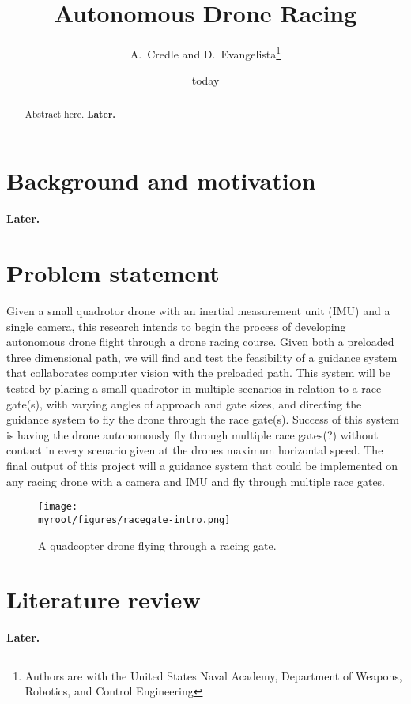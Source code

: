 \documentclass[onecolumn,10pt]{IEEEtran}
\title{Autonomous Drone Racing}
\author{A.~Credle and D.~Evangelista\thanks{Authors are with the United States Naval Academy, Department of Weapons, Robotics, and Control Engineering}}
\date{today}
\newcommand{\myroot}{../}
\newcommand{\Later}{\textbf{Later.}}
\begin{document}
\maketitle

\begin{abstract}
Abstract here. \Later
\end{abstract}

\section{Background and motivation}
\Later

\section{Problem statement}
Given a small quadrotor drone with an inertial measurement unit (IMU) and a single camera, this research intends to begin the process of developing autonomous drone flight through a drone racing course. Given both a preloaded three dimensional path,  we will find and test the feasibility of a guidance system that collaborates computer vision with the preloaded path. This system will be tested by placing a small quadrotor in multiple scenarios in relation to a race gate(s), with varying angles of approach and gate sizes, and directing the guidance system to fly the drone through the race gate(s). Success of this system is having the drone autonomously fly through multiple race gates(?) without contact in every scenario given at the drones maximum horizontal speed. The final output of this project will a guidance system that could be implemented on any racing drone with a camera and IMU and fly through multiple race gates. 
\begin{figure}[h]
\begin{center}
\texttt{[image: \\myroot/figures/racegate-intro.png]}
\end{center}
\caption{A quadcopter drone flying through a racing gate.}
\label{fig-problem-statement-1}
\end{figure}

\section{Literature review}
\Later
\end{document}
